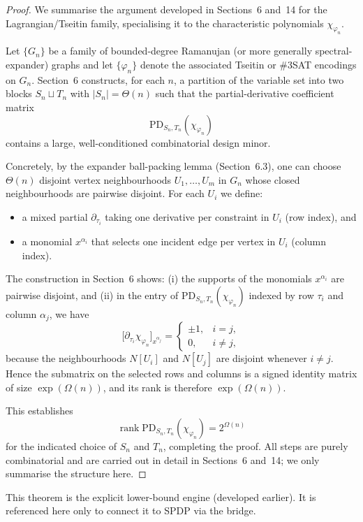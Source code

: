 \documentclass[12pt]{article}
\DeclareMathOperator{\rank}{rank}
\theoremstyle{definition}
\theoremstyle{definition}
\theoremstyle{remark}
\theoremstyle{remark}
\begin{document}
\begin{proof}
We summarise the argument developed in Sections~6 and~14 for the
Lagrangian/Tseitin family, specialising it to the characteristic
polynomials $\chi_{\varphi_n}$.

Let $\{G_n\}$ be a family of bounded-degree Ramanujan (or more generally
spectral-expander) graphs and let $\{\varphi_n\}$ denote the associated
Tseitin or \#3SAT encodings on $G_n$.
Section~6 constructs, for each $n$, a partition of the variable set into
two blocks $S_n \sqcup T_n$ with $|S_n| = \Theta(n)$ such that the
partial-derivative coefficient matrix
\[
  \mathrm{PD}_{S_n,T_n}(\chi_{\varphi_n})
\]
contains a large, well-conditioned combinatorial design minor.

Concretely, by the expander ball-packing lemma (Section~6.3), one can
choose $\Theta(n)$ disjoint vertex neighbourhoods $U_1,\dots,U_m$ in $G_n$
whose closed neighbourhoods are pairwise disjoint.
For each $U_i$ we define:
\begin{itemize}
  \item a mixed partial $\partial_{\tau_i}$ taking one derivative per
        constraint in $U_i$ (row index), and
  \item a monomial $x^{\alpha_i}$ that selects one incident edge per
        vertex in $U_i$ (column index).
\end{itemize}
The construction in Section~6 shows:
(i) the supports of the monomials $x^{\alpha_i}$ are pairwise disjoint,
and
(ii) in the entry of $\mathrm{PD}_{S_n,T_n}(\chi_{\varphi_n})$ indexed by
row $\tau_i$ and column $\alpha_j$, we have
\[
  \bigl[\partial_{\tau_i} \chi_{\varphi_n}\bigr]_{x^{\alpha_j}}
  =
  \begin{cases}
    \pm 1, & i=j,\\
    0, & i\ne j,
  \end{cases}
\]
because the neighbourhoods $N[U_i]$ and $N[U_j]$ are disjoint whenever
$i\ne j$.
Hence the submatrix on the selected rows and columns is a signed identity
matrix of size $\exp(\Omega(n))$, and its rank is therefore
$\exp(\Omega(n))$.

This establishes
\[
  \rank \mathrm{PD}_{S_n,T_n}(\chi_{\varphi_n}) = 2^{\Omega(n)}
\]
for the indicated choice of $S_n$ and $T_n$, completing the proof.
All steps are purely combinatorial and are carried out in detail in
Sections~6 and~14; we only summarise the structure here.
\end{proof}

This theorem is the explicit lower-bound engine (developed earlier). It is referenced here only to connect it to SPDP via the bridge.
\end{document}
